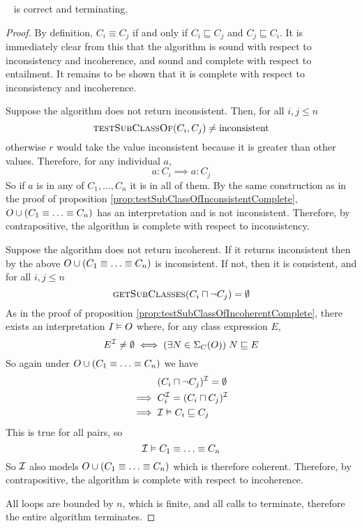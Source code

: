 \documentclass[paper.tex]{subfiles}
\begin{document}
\begin{theorem}
  \sloppy~
   is correct and terminating.
\end{theorem}
\begin{proof}
  By definition, $C_i \equiv C_j$ if and only if $C_i \sqsubseteq C_j$ and $C_j \sqsubseteq C_i$.  It is immediately clear from this that the algorithm is sound with respect to inconsistency and incoherence, and sound and complete with respect to entailment.  It remains to be shown that it is complete with respect to inconsistency and incoherence.

  Suppose the algorithm does not return inconsistent.  Then, for all $i,j \le n$
  \[ \Call{testSubClassOf}{C_i, C_j} \ne \inconsistent \]
  otherwise $r$ would take the value inconsistent because it is greater than other values.
  Therefore, for any individual $a$,
  \[ a : C_i \implies a : C_j \]
  So if $a$ is in any of $C_1, \ldots, C_n$ it is in all of them.  By the same construction as in the proof of proposition \ref{prop:testSubClassOfInconsistentComplete}, $O \cup (C_1 \equiv \ldots \equiv C_n)$ has an interpretation and is not inconsistent.  Therefore, by contrapositive, the algorithm is complete with respect to inconsistency.

  Suppose the algorithm does not return incoherent.  If it returns inconsistent then by the above $O \cup (C_1 \equiv \ldots \equiv C_n)$ is inconsistent.  If not, then it is consistent, and for all $i,j \le n$
  \[ \Call{getSubClasses}{C_i \sqcap \neg C_j} = \emptyset \]
  As in the proof of proposition \ref{prop:testSubClassOfIncoherentComplete}, there exists an interpretation $I \vDash O$ where, for any class expression $E$,
  \[ E^{\mathcal{I}} \ne \emptyset \iff (\exists N \in \Sigma_C(O)) \; N \sqsubseteq E \]
  So again under $O \cup (C_1 \equiv \ldots \equiv C_n)$ we have
  \begin{align*}
    & (C_i \sqcap \neg C_j)^{\mathcal{I}} = \emptyset \\
    \implies{}& C_i^{\mathcal{I}} = (C_i \sqcap C_j)^{\mathcal{I}} \\
    \implies{}& \mathcal{I} \vDash C_i \sqsubseteq C_j
  \end{align*}
  This is true for all pairs, so
  \[ \mathcal{I} \vDash C_1 \equiv \ldots \equiv C_n \]
  So $\mathcal{I}$ also models $O \cup (C_1 \equiv \ldots \equiv C_n)$ which is therefore coherent.  Therefore, by contrapositive, the algorithm is complete with respect to incoherence.

  All loops are bounded by $n$, which is finite, and all calls to  terminate, therefore the entire algorithm terminates.
\end{proof}
\end{document}
